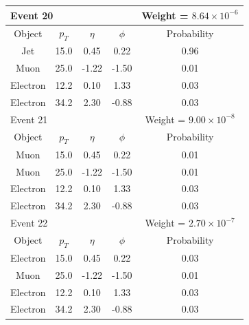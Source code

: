 \documentclass{cmspaper}
\begin{document}
\begin{tabular}{|c|c|c|c|c|}
\multicolumn{4}{|l|}{Event 20} & Weight = $8.64 \times 10^{-6}$ \\
\hline
Object & $p_T$ & $\eta$ & $\phi$ & Probability \\ 
 \hline 
Jet & 15.0 & 0.45 & 0.22 & 0.96 \\
Muon & 25.0 & -1.22 & -1.50 & 0.01 \\
Electron & 12.2 & 0.10 & 1.33 &  0.03 \\
Electron & 34.2 & 2.30 & -0.88 & 0.03 \\
 \hline 
 \hline 

\multicolumn{4}{|l|}{Event 21} & Weight = $9.00 \times 10^{-8}$ \\
\hline
Object & $p_T$ & $\eta$ & $\phi$ & Probability \\ 
 \hline 
Muon & 15.0 & 0.45 & 0.22 & 0.01 \\
Muon & 25.0 & -1.22 & -1.50 & 0.01 \\
Electron & 12.2 & 0.10 & 1.33 &  0.03 \\
Electron & 34.2 & 2.30 & -0.88 & 0.03 \\
 \hline 
 \hline 

\multicolumn{4}{|l|}{Event 22} & Weight = $2.70 \times 10^{-7}$ \\
\hline
Object & $p_T$ & $\eta$ & $\phi$ & Probability \\ 
 \hline 
Electron & 15.0 & 0.45 & 0.22 & 0.03 \\
Muon & 25.0 & -1.22 & -1.50 & 0.01 \\
Electron & 12.2 & 0.10 & 1.33 &  0.03 \\
Electron & 34.2 & 2.30 & -0.88 & 0.03 \\
 \hline 
 \hline 

\end{tabular} 
\end{document}
